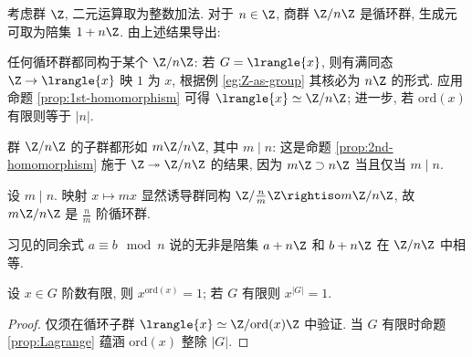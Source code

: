 \begin{example}[循环群的结构]\label{eg:cyclic-group}
	考虑群 $\Z$, 二元运算取为整数加法. 对于 $n \in \Z$, 商群 $\Z/n\Z$ 是循环群, 生成元可取为陪集 $1 + n\Z$. 由上述结果导出:
	\begin{compactenum}[(i)]
		\item 任何循环群都同构于某个 $\Z/n\Z$: 若 $G=\lrangle{x}$, 则有满同态 $\Z \to \lrangle{x}$ 映 $1$ 为 $x$, 根据例 \ref{eg:Z-as-group} 其核必为 $n\Z$ 的形式. 应用命题 \ref{prop:1st-homomorphism} 可得 $\lrangle{x} \simeq \Z/n\Z$; 进一步, 若 $\text{ord}(x)$ 有限则等于 $|n|$.
		\item 群 $\Z/n\Z$ 的子群都形如 $m\Z/n\Z$, 其中 $m \mid n$: 这是命题 \ref{prop:2nd-homomorphism} 施于 $\Z \twoheadrightarrow \Z/n\Z$ 的结果, 因为 $m\Z \supset n\Z$ 当且仅当 $m \mid n$.
		\item 设 $m \mid n$. 映射 $x \mapsto mx$ 显然诱导群同构 $\Z/\frac{n}{m}\Z \rightiso m\Z/n\Z$, 故 $m\Z/n\Z$ 是 $\frac{n}{m}$ 阶循环群.
	\end{compactenum}
	习见的同余式 $a \equiv b \mod n$ 说的无非是陪集 $a+n\Z$ 和 $b+n\Z$ 在 $\Z/n\Z$ 中相等.
\end{example}

\begin{proposition}\label{prop:ord-power}
	设 $x \in G$ 阶数有限, 则 $x^{\text{ord}(x)}=1$; 若 $G$ 有限则 $x^{|G|}=1$.
\end{proposition}
\begin{proof}
	仅须在循环子群 $\lrangle{x} \simeq \Z/\text{ord}(x)\Z$ 中验证. 当 $G$ 有限时命题 \ref{prop:Lagrange} 蕴涵 $\text{ord}(x)$ 整除 $|G|$.
\end{proof}


